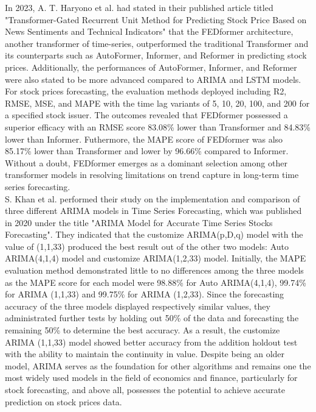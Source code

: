 \documentclass[conference]{IEEEtran}
\begin{document}
In 2023, A. T. Haryono et al. \cite{b1} had stated in their published article titled "Transformer-Gated Recurrent Unit Method for Predicting Stock Price Based on News Sentiments and Technical Indicators" that the FEDformer architecture, another transformer of time-series, outperformed the traditional Transformer and its counterparts such as AutoFormer, Informer, and Reformer in predicting stock prices. Additionally, the performances of AutoFormer, Informer, and Reformer were also stated to be more advanced compared to ARIMA and LSTM models. For stock prices forecasting, the evaluation methods deployed including R2, RMSE, MSE, and MAPE with the time lag variants of 5, 10, 20, 100, and 200 for a specified stock issuer. The outcomes revealed that FEDformer possessed a superior efficacy with an RMSE score 83.08\% lower than Transformer and 84.83\% lower than Informer. Futhermore, the MAPE score of FEDformer was also 85.17\% lower than Transformer and lower by 96.66\% compared to Informer. Without a doubt, FEDformer emerges as a dominant selection among other transformer models in resolving limitations on trend capture in long-term time series forecasting.  \\

S. Khan et al. \cite{b2} performed their study on the implementation and comparison of three different ARIMA models in Time Series Forecasting, which was published in 2020 under the title "ARIMA Model for Accurate Time Series Stocks Forecasting". They indicated that the customize ARIMA(p,D,q) model with the value of (1,1,33) produced the best result out of the other two models: Auto ARIMA(4,1,4) model and customize ARIMA(1,2,33) model. Initially, the MAPE evaluation method demonstrated little to no differences among the three models as the MAPE score for each model were 98.88\% for Auto ARIMA(4,1,4), 99.74\% for ARIMA (1,1,33) and 99.75\% for ARIMA (1,2,33). Since the forecasting accuracy of the three models displayed respectively similar values, they administrated further tests by holding out 50\% of the data and forecasting the remaining 50\% to determine the best accuracy. As a result, the customize ARIMA (1,1,33) model showed better accuracy from the addition holdout test with the ability to maintain the continuity in value. Despite being an older model, ARIMA serves as the foundation for other algorithms and remains one the most widely used models in the field of economics and finance, particularly for stock forecasting, and above all, possesses the potential to achieve accurate prediction on stock prices data. \\
\end{document}
